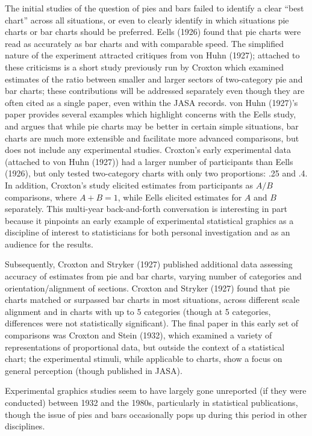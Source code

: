 \documentclass[
  10pt,
  letterpaper,
  twocolumn]{article}
\begin{document}
The initial studies of the question of pies and bars failed to identify
a clear ``best chart'' across all situations, or even to clearly
identify in which situations pie charts or bar charts should be
preferred. Eells (1926) found that pie charts were read as accurately as
bar charts and with comparable speed. The simplified nature of the
experiment attracted critiques from von Huhn (1927); attached to these
criticisms is a short study previously run by Croxton which examined
estimates of the ratio between smaller and larger sectors of
two-category pie and bar charts; these contributions will be addressed
separately even though they are often cited as a single paper, even
within the JASA records. von Huhn (1927)'s paper provides several
examples which highlight concerns with the Eells study, and argues that
while pie charts may be better in certain simple situations, bar charts
are much more extensible and facilitate more advanced comparisons, but
does not include any experimental studies. Croxton's early experimental
data (attached to von Huhn (1927)) had a larger number of participants
than Eells (1926), but only tested two-category charts with only two
proportions: .25 and .4. In addition, Croxton's study elicited estimates
from participants as \(A/B\) comparisons, where \(A + B = 1\), while
Eells elicited estimates for \(A\) and \(B\) separately. This multi-year
back-and-forth conversation is interesting in part because it pinpoints
an early example of experimental statistical graphics as a discipline of
interest to statisticians for both personal investigation and as an
audience for the results.

Subsequently, Croxton and Stryker (1927) published additional data
assessing accuracy of estimates from pie and bar charts, varying number
of categories and orientation/alignment of sections. Croxton and Stryker
(1927) found that pie charts matched or surpassed bar charts in most
situations, across different scale alignment and in charts with up to 5
categories (though at 5 categories, differences were not statistically
significant). The final paper in this early set of comparisons was
Croxton and Stein (1932), which examined a variety of representations of
proportional data, but outside the context of a statistical chart; the
experimental stimuli, while applicable to charts, show a focus on
general perception (though published in JASA).

Experimental graphics studies seem to have largely gone unreported (if
they were conducted) between 1932 and the 1980s, particularly in
statistical publications, though the issue of pies and bars occasionally
pops up during this period in other disciplines.
\end{document}
